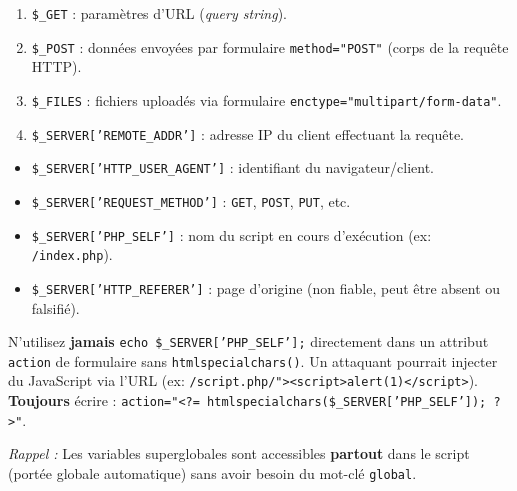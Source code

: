 \documentclass[11pt]{article}
\begin{document}
\begin{corrige}

\begin{enumerate}
    \item \texttt{\$\_GET} : paramètres d'URL (\emph{query string}).
    \item \texttt{\$\_POST} : données envoyées par formulaire \texttt{method="POST"} (corps de la requête HTTP).
    \item \texttt{\$\_FILES} : fichiers uploadés via formulaire \texttt{enctype="multipart/form-data"}.
    \item \texttt{\$\_SERVER['REMOTE\_ADDR']} : adresse IP du client effectuant la requête.
\end{enumerate}

\begin{exemplebox}
\begin{itemize}
    \item \texttt{\$\_SERVER['HTTP\_USER\_AGENT']} : identifiant du navigateur/client.
    \item \texttt{\$\_SERVER['REQUEST\_METHOD']} : \texttt{GET}, \texttt{POST}, \texttt{PUT}, etc.
    \item \texttt{\$\_SERVER['PHP\_SELF']} : nom du script en cours d'exécution (ex: \texttt{/index.php}).
    \item \texttt{\$\_SERVER['HTTP\_REFERER']} : page d'origine (non fiable, peut être absent ou falsifié).
\end{itemize}
\end{exemplebox}

\begin{attention}
N'utilisez \textbf{jamais} \texttt{echo \$\_SERVER['PHP\_SELF'];} directement dans un attribut \texttt{action} de formulaire sans \texttt{htmlspecialchars()}. Un attaquant pourrait injecter du JavaScript via l'URL (ex: \texttt{/script.php/"><script>alert(1)</script>}). \textbf{Toujours} écrire : \texttt{action="<?= htmlspecialchars(\$\_SERVER['PHP\_SELF']); ?>"}.
\end{attention}

\emph{Rappel :} Les variables superglobales sont accessibles \textbf{partout} dans le script (portée globale automatique) sans avoir besoin du mot-clé \texttt{global}.
\end{corrige}
\end{document}
